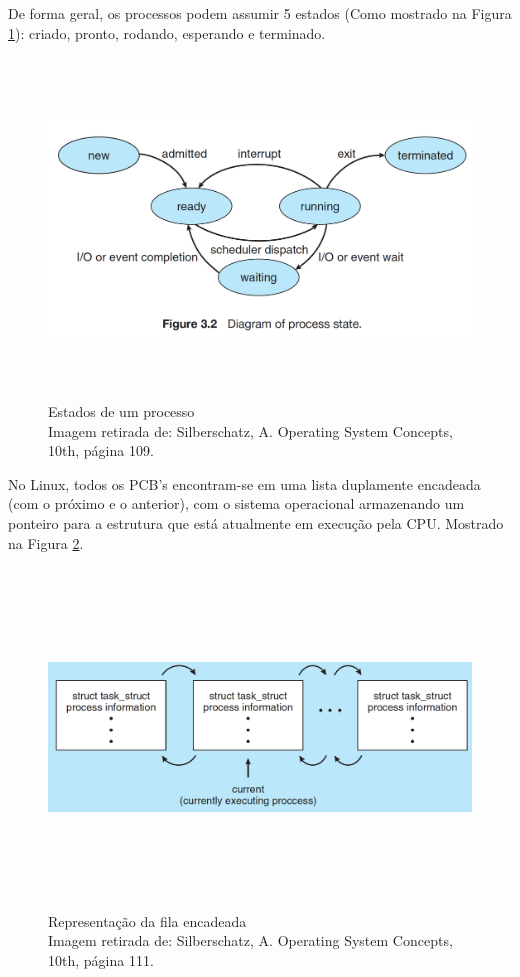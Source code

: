 De forma geral, os processos podem assumir 5 estados (Como mostrado na
Figura \ref{fig:Estados de um process}): criado, pronto, rodando, esperando e terminado.


\begin{figure}[h!]
\centering
\includegraphics[keepaspectratio, width=12cm, height=9cm]{imagens/05/05 - Diagram of Process State.png}
\caption{Estados de um processo   \\
Imagem retirada de: Silberschatz, A. Operating System Concepts, 10th,
página 109. \\}
\label{fig:Estados de um process}
\end{figure}


No Linux, todos os PCB's encontram-se em uma lista duplamente encadeada
(com o próximo e o anterior), com o sistema operacional armazenando um
ponteiro para a estrutura que está atualmente em execução pela CPU.
Mostrado na Figura \ref{fig:Representação da fila encadeada}.


\begin{figure}[H]
\centering
\includegraphics[keepaspectratio, width=12cm, height=9cm]{imagens/05/05 - Representacao da fila encadeada.png}
\caption{Representação da fila encadeada   \\
Imagem retirada de: Silberschatz, A. Operating System Concepts, 10th,
página 111. \\}
\label{fig:Representação da fila encadeada}
\end{figure}



